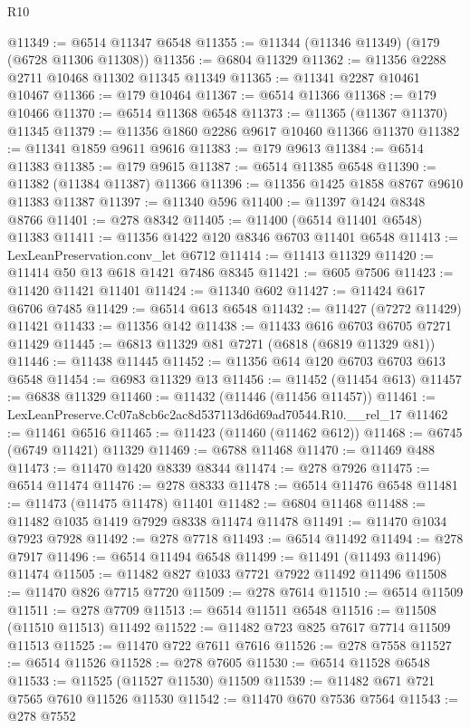 \begin{lexlean}{R10}
\begin{coremodule}
@11349 := @6514 @11347 @6548
@11355 := @11344 (@11346 @11349) (@179 (@6728 @11306 @11308))
@11356 := @6804 @11329
@11362 := @11356 @2288 @2711 @10468 @11302 @11345 @11349
@11365 := @11341 @2287 @10461 @10467
@11366 := @179 @10464
@11367 := @6514 @11366
@11368 := @179 @10466
@11370 := @6514 @11368 @6548
@11373 := @11365 (@11367 @11370) @11345
@11379 := @11356 @1860 @2286 @9617 @10460 @11366 @11370
@11382 := @11341 @1859 @9611 @9616
@11383 := @179 @9613
@11384 := @6514 @11383
@11385 := @179 @9615
@11387 := @6514 @11385 @6548
@11390 := @11382 (@11384 @11387) @11366
@11396 := @11356 @1425 @1858 @8767 @9610 @11383 @11387
@11397 := @11340 @596
@11400 := @11397 @1424 @8348 @8766
@11401 := @278 @8342
@11405 := @11400 (@6514 @11401 @6548) @11383
@11411 := @11356 @1422 @120 @8346 @6703 @11401 @6548
@11413 := LexLeanPreservation.conv_let @6712
@11414 := @11413 @11329
@11420 := @11414 @50 @13 @618 @1421 @7486 @8345
@11421 := @605 @7506
@11423 := @11420 @11421 @11401
@11424 := @11340 @602
@11427 := @11424 @617 @6706 @7485
@11429 := @6514 @613 @6548
@11432 := @11427 (@7272 @11429) @11421
@11433 := @11356 @142
@11438 := @11433 @616 @6703 @6705 @7271 @11429
@11445 := @6813 @11329 @81 @7271 (@6818 (@6819 @11329 @81))
@11446 := @11438 @11445
@11452 := @11356 @614 @120 @6703 @6703 @613 @6548
@11454 := @6983 @11329 @13
@11456 := @11452 (@11454 @613)
@11457 := @6838 @11329
@11460 := @11432 (@11446 (@11456 @11457))
@11461 := LexLeanPreserve.Cc07a8cb6c2ac8d537113d6d69ad70544.R10.__rel_17
@11462 := @11461 @6516
@11465 := @11423 (@11460 (@11462 @612))
@11468 := @6745 (@6749 @11421) @11329
@11469 := @6788 @11468
@11470 := @11469 @488
@11473 := @11470 @1420 @8339 @8344
@11474 := @278 @7926
@11475 := @6514 @11474
@11476 := @278 @8333
@11478 := @6514 @11476 @6548
@11481 := @11473 (@11475 @11478) @11401
@11482 := @6804 @11468
@11488 := @11482 @1035 @1419 @7929 @8338 @11474 @11478
@11491 := @11470 @1034 @7923 @7928
@11492 := @278 @7718
@11493 := @6514 @11492
@11494 := @278 @7917
@11496 := @6514 @11494 @6548
@11499 := @11491 (@11493 @11496) @11474
@11505 := @11482 @827 @1033 @7721 @7922 @11492 @11496
@11508 := @11470 @826 @7715 @7720
@11509 := @278 @7614
@11510 := @6514 @11509
@11511 := @278 @7709
@11513 := @6514 @11511 @6548
@11516 := @11508 (@11510 @11513) @11492
@11522 := @11482 @723 @825 @7617 @7714 @11509 @11513
@11525 := @11470 @722 @7611 @7616
@11526 := @278 @7558
@11527 := @6514 @11526
@11528 := @278 @7605
@11530 := @6514 @11528 @6548
@11533 := @11525 (@11527 @11530) @11509
@11539 := @11482 @671 @721 @7565 @7610 @11526 @11530
@11542 := @11470 @670 @7536 @7564
@11543 := @278 @7552

\end{coremodule}
\end{lexlean}
